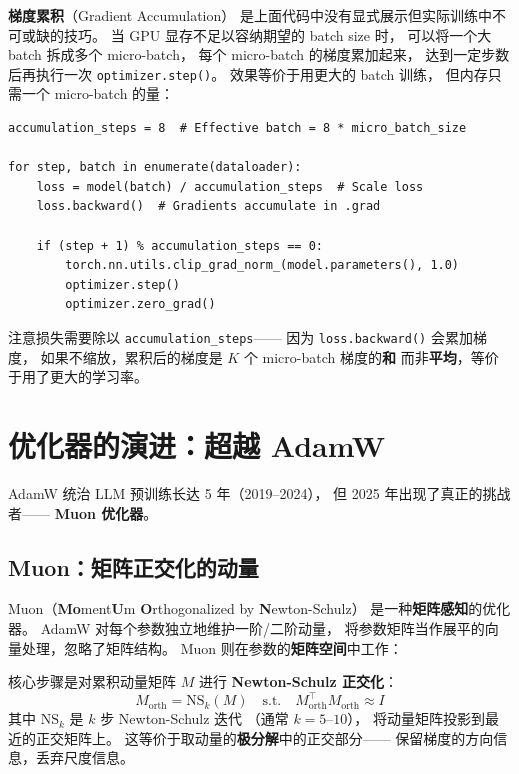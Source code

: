 \textbf{梯度累积}（Gradient Accumulation）
是上面代码中没有显式展示但实际训练中不可或缺的技巧。
当 GPU 显存不足以容纳期望的 batch size 时，
可以将一个大 batch 拆成多个 micro-batch，
每个 micro-batch 的梯度累加起来，
达到一定步数后再执行一次 \texttt{optimizer.step()}。
效果等价于用更大的 batch 训练，
但内存只需一个 micro-batch 的量：

\begin{lstlisting}[caption={Gradient accumulation}]
accumulation_steps = 8  # Effective batch = 8 * micro_batch_size

for step, batch in enumerate(dataloader):
    loss = model(batch) / accumulation_steps  # Scale loss
    loss.backward()  # Gradients accumulate in .grad

    if (step + 1) % accumulation_steps == 0:
        torch.nn.utils.clip_grad_norm_(model.parameters(), 1.0)
        optimizer.step()
        optimizer.zero_grad()
\end{lstlisting}

注意损失需要除以 \texttt{accumulation\_steps}——
因为 \texttt{loss.backward()} 会累加梯度，
如果不缩放，累积后的梯度是 $K$ 个 micro-batch 梯度的\textbf{和}
而非\textbf{平均}，等价于用了更大的学习率。

\section{优化器的演进：超越 AdamW}
\label{sec:new-optimizers}

AdamW 统治 LLM 预训练长达 5 年（2019--2024），
但 2025 年出现了真正的挑战者——
\textbf{Muon 优化器}。

\subsection{Muon：矩阵正交化的动量}

Muon（\textbf{Mo}ment\textbf{U}m \textbf{O}rthogonalized
by \textbf{N}ewton-Schulz）%
是一种\textbf{矩阵感知}的优化器。
AdamW 对每个参数独立地维护一阶/二阶动量，
将参数矩阵当作展平的向量处理，忽略了矩阵结构。
Muon 则在参数的\textbf{矩阵空间}中工作：

核心步骤是对累积动量矩阵 $M$ 进行
\textbf{Newton-Schulz 正交化}：
\begin{equation}
  M_{\mathrm{orth}} = \mathrm{NS}_k(M)
  \quad \text{s.t.} \quad M_{\mathrm{orth}}^\top M_{\mathrm{orth}} \approx I
\end{equation}
其中 $\mathrm{NS}_k$ 是 $k$ 步 Newton-Schulz 迭代
（通常 $k = 5$--$10$），
将动量矩阵投影到最近的正交矩阵上。
这等价于取动量的\textbf{极分解}中的正交部分——
保留梯度的方向信息，丢弃尺度信息。

